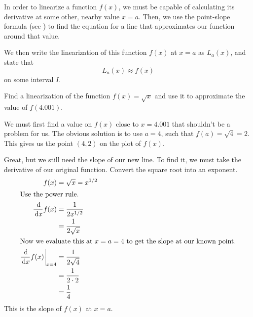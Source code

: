 In order to linearize a function $f(x)$, we must be capable of calculating its derivative at some other, nearby value $x=a$.
Then, we use the point-slope formula (see ) to find the equation for a line that approximates our function around that value.

We then write the linearization of this function $f(x)$ at $x=a$ as $L_a (x)$, and state that
\[ L_a (x) \approx f(x) \]
on some interval $I$.

\begin{ex}
  Find a linearization of the function $f(x)=\sqrt{x}$ and use it to approximate the value of $f(4.001)$.
  \begin{sol}
    We must first find a value on $f(x)$ close to $x=4.001$ that shouldn't be a problem for us.
    The obvious solution is to use $a=4$, such that $f(a)=\sqrt{4}=2$.
    This gives us the point $(4, 2)$ on the plot of $f(x)$.

    Great, but we still need the slope of our new line.
    To find it, we must take the derivative of our original function.
    Convert the square root into an exponent.
    \begin{align}
      f(x) &= \sqrt{x} = x^{1/2} \\
      \intertext{Use the power rule.}
      \frac{\,\mathrm{d}}{\,\mathrm{d} x} f(x) &= \frac{1}{2x^{1/2}} \\
      &= \frac{1}{2\sqrt x} \\
      \intertext{Now we evaluate this at $x=a=4$ to get the slope at our known point.}
      \frac{\,\mathrm{d}}{\,\mathrm{d} x} f(x) \bigg|_{x=4}&= \frac{1}{2\sqrt{4}} \\
      &= \frac{1}{2\cdot 2} \\
      &= \frac{1}{4}
    \end{align}
    This is the slope of $f(x)$ at $x=a$.


\end{sol}
\end{ex}
